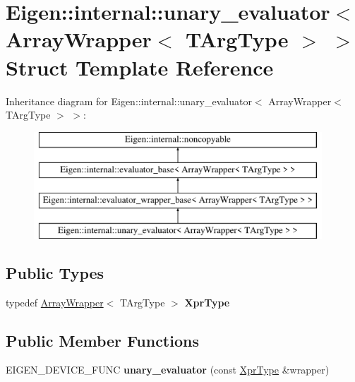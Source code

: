\hypertarget{struct_eigen_1_1internal_1_1unary__evaluator_3_01_array_wrapper_3_01_t_arg_type_01_4_01_4}{}\section{Eigen\+::internal\+::unary\+\_\+evaluator$<$ Array\+Wrapper$<$ T\+Arg\+Type $>$ $>$ Struct Template Reference}
\label{struct_eigen_1_1internal_1_1unary__evaluator_3_01_array_wrapper_3_01_t_arg_type_01_4_01_4}
Inheritance diagram for Eigen\+::internal\+::unary\+\_\+evaluator$<$ Array\+Wrapper$<$ T\+Arg\+Type $>$ $>$\+:\begin{figure}[H]
\begin{center}
\leavevmode
\includegraphics[height=4.000000cm]{struct_eigen_1_1internal_1_1unary__evaluator_3_01_array_wrapper_3_01_t_arg_type_01_4_01_4}
\end{center}
\end{figure}
\subsection*{Public Types}
\begin{DoxyCompactItemize}
\item 
\mbox{\label{struct_eigen_1_1internal_1_1unary__evaluator_3_01_array_wrapper_3_01_t_arg_type_01_4_01_4_a71639b3cf31f6c78b2f42ab7d7b0fa57}} 
typedef \mbox{\hyperlink{class_eigen_1_1_array_wrapper}{Array\+Wrapper}}$<$ T\+Arg\+Type $>$ {\bfseries Xpr\+Type}
\end{DoxyCompactItemize}
\subsection*{Public Member Functions}
\begin{DoxyCompactItemize}
\item 
\mbox{\label{struct_eigen_1_1internal_1_1unary__evaluator_3_01_array_wrapper_3_01_t_arg_type_01_4_01_4_a2fc5a18e251618aa6b136c7062876473}} 
E\+I\+G\+E\+N\+\_\+\+D\+E\+V\+I\+C\+E\+\_\+\+F\+U\+NC {\bfseries unary\+\_\+evaluator} (const \mbox{\hyperlink{class_eigen_1_1_array_wrapper}{Xpr\+Type}} \&wrapper)
\end{DoxyCompactItemize}
